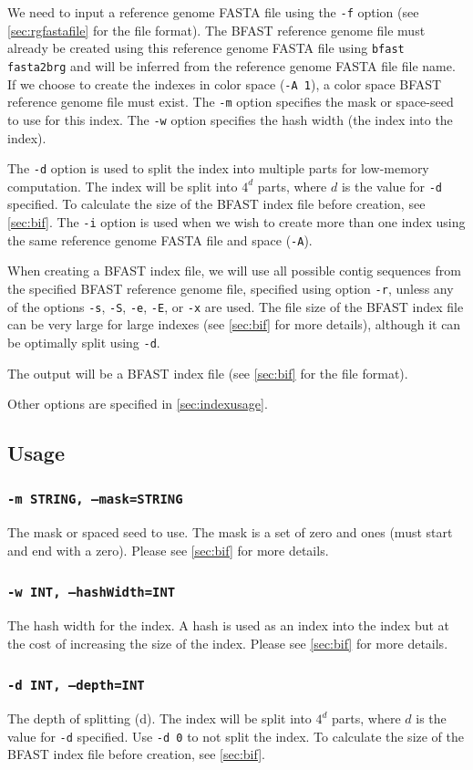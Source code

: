 \documentclass[a4paper,12pt]{book}
\newcommand{\TT}[1]{{\tt #1}} %
\newcommand{\rGFF}{reference genome FASTA file}
\newcommand{\BRGF}{BFAST reference genome file} %
\newcommand{\BIF}{BFAST index file} %
\begin{document}
We need to input a \rGFF{} using the \TT{-f} option (see \autoref{sec:rgfastafile} for the file format).
The \BRGF{} must already be created using this \rGFF{} using \TT{bfast fasta2brg} and will be inferred from the \rGFF{} file name.
If we choose to create the indexes in color space (\TT{-A 1}), a color space \BRGF{} must exist.
The \TT{-m} option specifies the mask or space-seed to use for this index.
The \TT{-w} option specifies the hash width (the index into the index).

The \TT{-d} option is used to split the index into multiple parts for low-memory computation.
The index will be split into $4^d$ parts, where $d$ is the value for \TT{-d} specified.
To calculate the size of the \BIF{} before creation, see \autoref{sec:bif}.
The \TT{-i} option is used when we wish to create more than one index using the same \rGFF{} and space (\TT{-A}).

When creating a \BIF{}, we will use all possible contig sequences from the specified \BRGF{}, specified using option \TT{-r}, unless any of the options \TT{-s}, \TT{-S}, \TT{-e}, \TT{-E}, or \TT{-x} are used.
The file size of the \BIF{} can be very large for large indexes (see \autoref{sec:bif} for more details), although it can be optimally split using \TT{-d}.

The output will be a \BIF{} (see \autoref{sec:bif} for the file format).

Other options are specified in \autoref{sec:indexusage}.
\subsection{Usage}
\label{sec:indexusage}

\subsubsection{\TT{-m STRING, --mask=STRING}}
The mask or spaced seed to use.
The mask is a set of zero and ones (must start and end with a zero).
Please see \autoref{sec:bif} for more details.

\subsubsection{\TT{-w INT, --hashWidth=INT}}
The hash width for the index.
A hash is used as an index into the index but at the cost of increasing the size of the index.
Please see \autoref{sec:bif} for more details.

\subsubsection{\TT{-d INT, --depth=INT}}
The depth of splitting (d).  
The index will be split into $4^d$ parts, where $d$ is the value for \TT{-d} specified.
Use \TT{-d 0} to not split the index.
To calculate the size of the \BIF{} before creation, see \autoref{sec:bif}.
\end{document}
